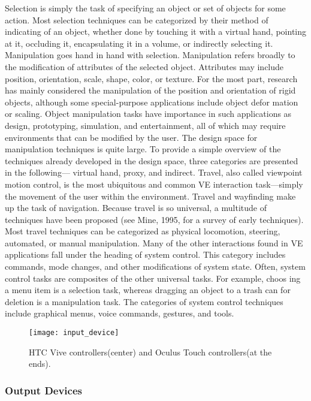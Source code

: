 Selection is simply the task of specifying an object or set of objects for some action. 
Most selection techniques can be categorized by their method of indicating of an object, whether 
done by touching it with a virtual hand, pointing at it, occluding it, encapsulating it in a volume, or 
indirectly selecting it. Manipulation goes hand in hand with selection. Manipulation refers broadly to the  modification of 
attributes of the selected object. Attributes may include position, orientation, scale, shape, color, 
or texture. For the most part, research has mainly considered the manipulation of the  position 
and orientation of rigid objects, although some special-purpose applications include object defor
mation or scaling. Object manipulation tasks have importance in such applications as design, 
prototyping, simulation, and entertainment, all of which may require environments that can be 
modified by the user. The design space for manipulation techniques is quite large. To provide a simple overview of the 
techniques already developed in the design space, three categories are presented in the following—
virtual hand, proxy, and indirect. Travel, also called viewpoint motion control, is the most ubiquitous and common \gls{VE} interaction 
task—simply the movement of the user within the environment. Travel and wayfinding make up the task of navigation. Because travel is so universal, a multitude of techniques have been proposed 
(see Mine, 1995, for a survey of early techniques). Most travel techniques can be categorized as physical locomotion, 
steering, automated, or manual manipulation. Many of the other interactions found in VE applications fall under the heading of system control. 
This category includes commands, mode changes, and other modifications of system state. 
Often, system control tasks are composites of the other universal tasks. For example, choos
ing a menu item is a selection task, whereas dragging an object to a trash can for deletion is a 
manipulation task. The categories of system control techniques include graphical 
menus, voice commands, gestures, and tools.~\cite{hale2014handbook}


\begin{figure}[h!]
    \centering
    \texttt{[image: input\_device]}
    \caption{HTC Vive controllers(center) and Oculus Touch controllers(at the ends).~\cite{article_input_devices}}
    \label{fig:input_device}
\end{figure}


\subsubsection{Output Devices}
\label{sec:output_devices}

